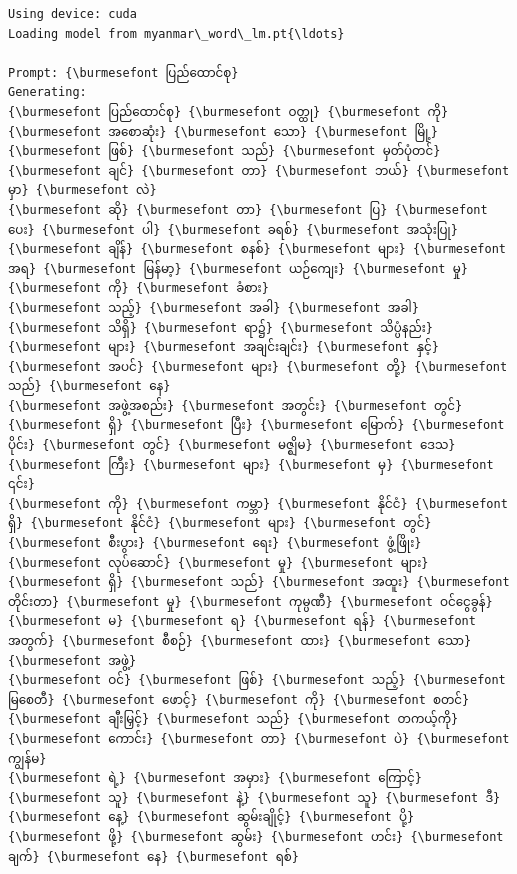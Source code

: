 \documentclass[11pt]{article}
\begin{document}
    \begin{Verbatim}[commandchars=\\\{\}]
Using device: cuda
Loading model from myanmar\_word\_lm.pt{\ldots}

Prompt: {\burmesefont ပြည်ထောင်စု}
Generating:
{\burmesefont ပြည်ထောင်စု} {\burmesefont ဝတ္ထု} {\burmesefont ကို} {\burmesefont အစောဆုံး} {\burmesefont သော} {\burmesefont မြို့} {\burmesefont ဖြစ်} {\burmesefont သည်} {\burmesefont မှတ်ပုံတင်} {\burmesefont ချင်} {\burmesefont တာ} {\burmesefont ဘယ်} {\burmesefont မှာ} {\burmesefont လဲ}
{\burmesefont ဆို} {\burmesefont တာ} {\burmesefont ပြ} {\burmesefont ပေး} {\burmesefont ပါ} {\burmesefont ခရစ်} {\burmesefont အသုံးပြု} {\burmesefont ချိန်} {\burmesefont စနစ်} {\burmesefont များ} {\burmesefont အရ} {\burmesefont မြန်မာ့} {\burmesefont ယဉ်ကျေး} {\burmesefont မှု} {\burmesefont ကို} {\burmesefont ခံစား}
{\burmesefont သည့်} {\burmesefont အခါ} {\burmesefont အခါ} {\burmesefont သိရှိ} {\burmesefont ရာ၌} {\burmesefont သိပ္ပံနည်း} {\burmesefont များ} {\burmesefont အချင်းချင်း} {\burmesefont နှင့်} {\burmesefont အပင်} {\burmesefont များ} {\burmesefont တို့} {\burmesefont သည်} {\burmesefont နေ}
{\burmesefont အဖွဲ့အစည်း} {\burmesefont အတွင်း} {\burmesefont တွင်} {\burmesefont ရှိ} {\burmesefont ပြီး} {\burmesefont မြောက်} {\burmesefont ပိုင်း} {\burmesefont တွင်} {\burmesefont မဇ္ဈိမ} {\burmesefont ဒေသ} {\burmesefont ကြီး} {\burmesefont များ} {\burmesefont မှ} {\burmesefont ၎င်း}
{\burmesefont ကို} {\burmesefont ကမ္ဘာ} {\burmesefont နိုင်ငံ} {\burmesefont ရှိ} {\burmesefont နိုင်ငံ} {\burmesefont များ} {\burmesefont တွင်} {\burmesefont စီးပွား} {\burmesefont ရေး} {\burmesefont ဖွံ့ဖြိုး} {\burmesefont လုပ်ဆောင်} {\burmesefont မှု} {\burmesefont များ}
{\burmesefont ရှိ} {\burmesefont သည်} {\burmesefont အထူး} {\burmesefont တိုင်းတာ} {\burmesefont မှု} {\burmesefont ကုမ္ပဏီ} {\burmesefont ဝင်ငွေခွန်} {\burmesefont မ} {\burmesefont ရ} {\burmesefont ရန်} {\burmesefont အတွက်} {\burmesefont စီစဉ်} {\burmesefont ထား} {\burmesefont သော} {\burmesefont အဖွဲ့}
{\burmesefont ဝင်} {\burmesefont ဖြစ်} {\burmesefont သည့်} {\burmesefont မြစေတီ} {\burmesefont ဖောင့်} {\burmesefont ကို} {\burmesefont စတင်} {\burmesefont ချီးမြှင့်} {\burmesefont သည်} {\burmesefont တကယ့်ကို} {\burmesefont ကောင်း} {\burmesefont တာ} {\burmesefont ပဲ} {\burmesefont ကျွန်မ}
{\burmesefont ရဲ့} {\burmesefont အမှား} {\burmesefont ကြောင့်} {\burmesefont သူ} {\burmesefont နဲ့} {\burmesefont သူ} {\burmesefont ဒီ} {\burmesefont နေ့} {\burmesefont ဆွမ်းချိုင့်} {\burmesefont ပို့} {\burmesefont ဖို့} {\burmesefont ဆွမ်း} {\burmesefont ဟင်း} {\burmesefont ချက်} {\burmesefont နေ} {\burmesefont ရစ်}

\end{Verbatim}
\end{document}
